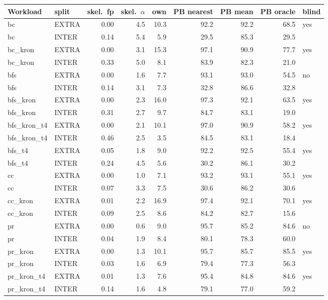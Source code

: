 \begin{tabular}{llrrrrrrl}
\toprule
Workload & split & skel.\ fp & skel.\ $\alpha$ & own & PB nearest & PB mean & PB oracle & blind \\
\midrule
bc & EXTRA & 0.00 & 4.5 & 10.3 & 92.2 & 92.2 & 68.5 & yes \\
bc & INTER & 0.14 & 5.4 & 5.9 & 29.5 & 85.3 & 29.5 &  \\
\addlinespace[2pt]
bc\_kron & EXTRA & 0.00 & 3.1 & 15.3 & 97.1 & 90.9 & 77.7 & yes \\
bc\_kron & INTER & 0.33 & 5.0 & 8.1 & 83.9 & 82.3 & 21.0 &  \\
\addlinespace[2pt]
bfs & EXTRA & 0.00 & 1.6 & 7.7 & 93.1 & 93.0 & 54.5 & no \\
bfs & INTER & 0.14 & 3.1 & 7.3 & 32.8 & 86.6 & 32.8 &  \\
\addlinespace[2pt]
bfs\_kron & EXTRA & 0.00 & 2.3 & 16.0 & 97.3 & 92.1 & 63.5 & yes \\
bfs\_kron & INTER & 0.31 & 2.7 & 9.7 & 84.7 & 83.1 & 19.0 &  \\
\addlinespace[2pt]
bfs\_kron\_t4 & EXTRA & 0.00 & 2.1 & 10.1 & 97.0 & 90.9 & 58.2 & yes \\
bfs\_kron\_t4 & INTER & 0.46 & 2.5 & 3.5 & 84.5 & 83.1 & 18.4 &  \\
\addlinespace[2pt]
bfs\_t4 & EXTRA & 0.05 & 1.8 & 9.0 & 92.2 & 92.5 & 55.4 & yes \\
bfs\_t4 & INTER & 0.24 & 4.5 & 5.6 & 30.2 & 86.1 & 30.2 &  \\
\addlinespace[2pt]
cc & EXTRA & 0.00 & 1.0 & 7.1 & 93.2 & 93.1 & 55.1 & yes \\
cc & INTER & 0.07 & 3.3 & 7.5 & 30.6 & 86.2 & 30.6 &  \\
\addlinespace[2pt]
cc\_kron & EXTRA & 0.01 & 2.2 & 16.9 & 97.4 & 92.1 & 70.1 & yes \\
cc\_kron & INTER & 0.09 & 2.5 & 8.6 & 84.2 & 82.7 & 15.6 &  \\
\addlinespace[2pt]
pr & EXTRA & 0.00 & 0.6 & 9.0 & 95.7 & 85.2 & 84.6 & no \\
pr & INTER & 0.04 & 1.9 & 8.4 & 80.1 & 78.3 & 60.0 &  \\
\addlinespace[2pt]
pr\_kron & EXTRA & 0.00 & 1.3 & 10.1 & 95.7 & 85.7 & 85.5 & yes \\
pr\_kron & INTER & 0.03 & 1.6 & 6.9 & 79.4 & 77.3 & 56.3 &  \\
\addlinespace[2pt]
pr\_kron\_t4 & EXTRA & 0.01 & 1.3 & 7.6 & 95.4 & 84.8 & 84.6 & yes \\
pr\_kron\_t4 & INTER & 0.14 & 1.6 & 4.8 & 79.1 & 77.0 & 59.2 &  \\

\end{tabular}
